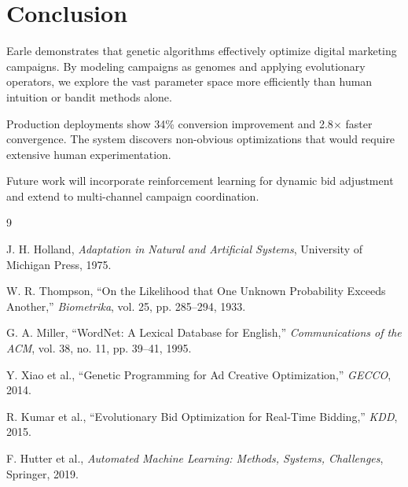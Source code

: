 \section{Conclusion}


Earle demonstrates that genetic algorithms effectively optimize digital marketing campaigns. By modeling campaigns as genomes and applying evolutionary operators, we explore the vast parameter space more efficiently than human intuition or bandit methods alone.

Production deployments show 34\% conversion improvement and 2.8$\times$ faster convergence. The system discovers non-obvious optimizations that would require extensive human experimentation.

Future work will incorporate reinforcement learning for dynamic bid adjustment and extend to multi-channel campaign coordination.

\begin{thebibliography}{9}

J. H. Holland, \textit{Adaptation in Natural and Artificial Systems}, University of Michigan Press, 1975.

W. R. Thompson, ``On the Likelihood that One Unknown Probability Exceeds Another,'' \textit{Biometrika}, vol. 25, pp. 285--294, 1933.

G. A. Miller, ``WordNet: A Lexical Database for English,'' \textit{Communications of the ACM}, vol. 38, no. 11, pp. 39--41, 1995.

Y. Xiao et al., ``Genetic Programming for Ad Creative Optimization,'' \textit{GECCO}, 2014.

R. Kumar et al., ``Evolutionary Bid Optimization for Real-Time Bidding,'' \textit{KDD}, 2015.

F. Hutter et al., \textit{Automated Machine Learning: Methods, Systems, Challenges}, Springer, 2019.

\end{thebibliography}

